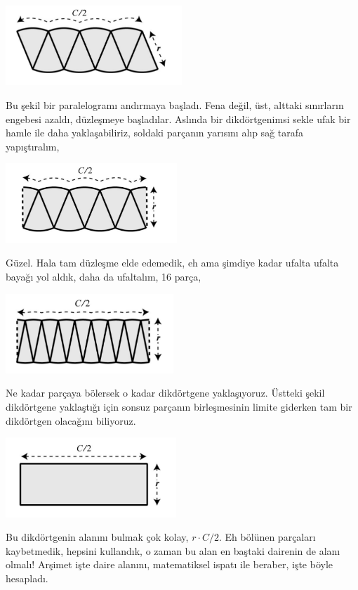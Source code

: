 \documentclass[12pt,fleqn]{article}\usepackage{../../common}
\begin{document}
\includegraphics[height=3cm]{circ_4.png}

Bu şekil bir paralelogramı andırmaya başladı. Fena değil, üst, alttaki
sınırların engebesi azaldı, düzleşmeye başladılar. Aslında bir
dikdörtgenimsi sekle ufak bir hamle ile daha yaklaşabiliriz, soldaki
parçanın yarısını alıp sağ tarafa yapıştıralım,

\includegraphics[height=3cm]{circ_5.png}

Güzel. Hala tam düzleşme elde edemedik, eh ama şimdiye kadar ufalta ufalta
bayağı yol aldık, daha da ufaltalım, 16 parça,

\includegraphics[height=3cm]{circ_6.png}

Ne kadar parçaya bölersek o kadar dikdörtgene yaklaşıyoruz. Üstteki şekil
dikdörtgene yaklaştığı için sonsuz parçanın birleşmesinin limite giderken
tam bir dikdörtgen olacağını biliyoruz. 

\includegraphics[height=3cm]{circ_7.png}

Bu dikdörtgenin alanını bulmak çok kolay, $r \cdot C/2$. Eh bölünen
parçaları kaybetmedik, hepsini kullandık, o zaman bu alan en baştaki
dairenin de alanı olmalı! Arşimet işte daire alanını, matematiksel ispatı
ile beraber, işte böyle hesapladı.
\end{document}
